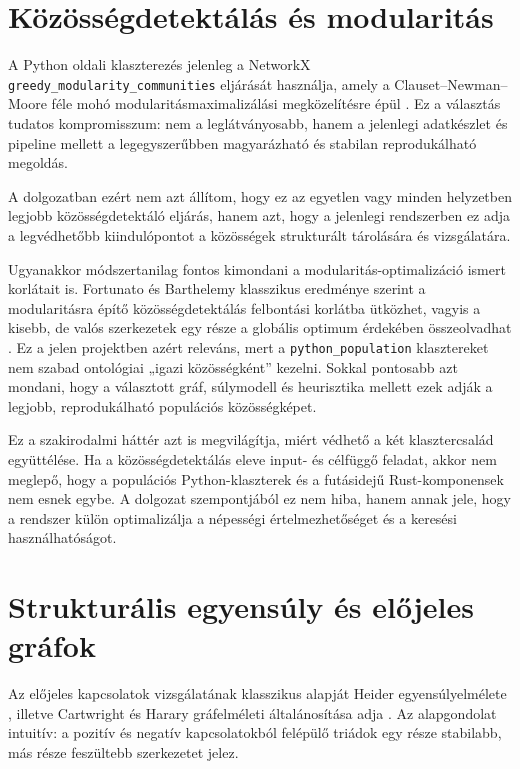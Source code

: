 \documentclass[a4paper,12pt]{report}
\begin{document}
\section{Közösségdetektálás és modularitás}

A Python oldali klaszterezés jelenleg a NetworkX \texttt{greedy\_modularity\_communities} eljárását használja, amely a Clauset--Newman--Moore féle mohó modularitásmaximalizálási megközelítésre épül \cite{clauset2004,networkx_greedy}. Ez a választás tudatos kompromisszum: nem a leglátványosabb, hanem a jelenlegi adatkészlet és pipeline mellett a legegyszerűbben magyarázható és stabilan reprodukálható megoldás.

A dolgozatban ezért nem azt állítom, hogy ez az egyetlen vagy minden helyzetben legjobb közösségdetektáló eljárás, hanem azt, hogy a jelenlegi rendszerben ez adja a legvédhetőbb kiindulópontot a közösségek strukturált tárolására és vizsgálatára.

Ugyanakkor módszertanilag fontos kimondani a modularitás-optimalizáció ismert korlátait is. Fortunato és Barthelemy klasszikus eredménye szerint a modularitásra építő közösségdetektálás felbontási korlátba ütközhet, vagyis a kisebb, de valós szerkezetek egy része a globális optimum érdekében összeolvadhat \cite{fortunato_barthelemy2007}. Ez a jelen projektben azért releváns, mert a \texttt{python\_population} klasztereket nem szabad ontológiai „igazi közösségként” kezelni. Sokkal pontosabb azt mondani, hogy a választott gráf, súlymodell és heurisztika mellett ezek adják a legjobb, reprodukálható populációs közösségképet.

Ez a szakirodalmi háttér azt is megvilágítja, miért védhető a két klasztercsalád együttélése. Ha a közösségdetektálás eleve input- és célfüggő feladat, akkor nem meglepő, hogy a populációs Python-klaszterek és a futásidejű Rust-komponensek nem esnek egybe. A dolgozat szempontjából ez nem hiba, hanem annak jele, hogy a rendszer külön optimalizálja a népességi értelmezhetőséget és a keresési használhatóságot.

\section{Strukturális egyensúly és előjeles gráfok}

Az előjeles kapcsolatok vizsgálatának klasszikus alapját Heider egyensúlyelmélete \cite{heider1946}, illetve Cartwright és Harary gráfelméleti általánosítása adja \cite{cartwright1956}. Az alapgondolat intuitív: a pozitív és negatív kapcsolatokból felépülő triádok egy része stabilabb, más része feszültebb szerkezetet jelez.
\end{document}
